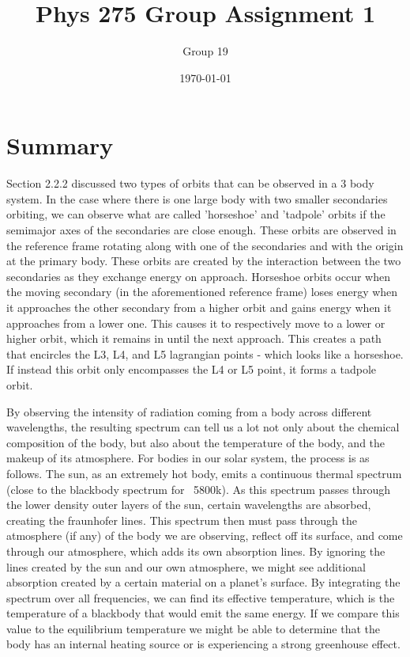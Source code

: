 \documentclass[11pt]{article}
\begin{document}
	\title{\textbf{Phys 275 Group Assignment 1}}
	\date{\today}
	\author{Group 19}
	\maketitle
	
	
	\newpage
	\section{Summary}

Section 2.2.2 discussed two types of orbits that can be observed in a 3 body system. In the case where there is one large body with two smaller secondaries orbiting, we can observe what are called 'horseshoe' and 'tadpole' orbits if the semimajor axes of the secondaries are close enough. These orbits are observed in the reference frame rotating along with one of the secondaries and with the origin at the primary body. These orbits are created by the interaction between the two secondaries as they exchange energy on approach. Horseshoe orbits occur when the moving secondary (in the aforementioned reference frame) loses energy when it approaches the other secondary from a higher orbit and gains energy when it approaches from a lower one. This causes it to respectively move to a lower or higher orbit, which it remains in until the next approach. This creates a path that encircles the L3, L4, and L5 lagrangian points - which looks like a horseshoe. If instead this orbit only encompasses the L4 or L5 point, it forms a tadpole orbit.

By observing the intensity of radiation coming from a body across different wavelengths, the resulting spectrum can tell us a lot not only about the chemical composition of the body, but also about the temperature of the body, and the makeup of its atmosphere. For bodies in our solar system, the process is as follows. The sun, as an extremely hot body, emits a continuous thermal spectrum (close to the blackbody spectrum for ~5800k). As this spectrum passes through the lower density outer layers of the sun, certain wavelengths are absorbed, creating the fraunhofer lines. This spectrum then must pass through the atmosphere (if any) of the body we are observing, reflect off its surface, and come through our atmosphere, which adds its own absorption lines. By ignoring the lines created by the sun and our own atmosphere, we might see additional absorption created by a certain material on a planet's surface. By integrating the spectrum over all frequencies, we can find its effective temperature, which is the temperature of a blackbody that would emit the same energy. If we compare this value to the equilibrium temperature we might be able to determine that the body has an internal heating source or is experiencing a strong greenhouse effect.
\end{document}
